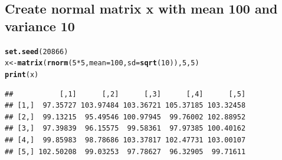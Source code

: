 \documentclass{article}\usepackage[]{graphicx}\usepackage[]{color}
\makeatletter
\newcommand{\hlnum}[1]{\textcolor[rgb]{0.686,0.059,0.569}{#1}}%
\newcommand{\hlopt}[1]{\textcolor[rgb]{0,0,0}{#1}}%
\newcommand{\hlstd}[1]{\textcolor[rgb]{0.345,0.345,0.345}{#1}}%
\newcommand{\hlkwb}[1]{\textcolor[rgb]{0.69,0.353,0.396}{#1}}%
\newcommand{\hlkwc}[1]{\textcolor[rgb]{0.333,0.667,0.333}{#1}}%
\newcommand{\hlkwd}[1]{\textcolor[rgb]{0.737,0.353,0.396}{\textbf{#1}}}%
\newenvironment{kframe}{%
 \def\at@end@of@kframe{}%
 \ifinner\ifhmode%
  \def\at@end@of@kframe{\end{minipage}}%
  \begin{minipage}{\columnwidth}%
 \fi\fi%
 \def\FrameCommand##1{\hskip\@totalleftmargin \hskip-\fboxsep
 \colorbox{shadecolor}{##1}\hskip-\fboxsep
     \hskip-\linewidth \hskip-\@totalleftmargin \hskip\columnwidth}%
 \MakeFramed {\advance\hsize-\width
   \@totalleftmargin\z@ \linewidth\hsize
   \@setminipage}}%
 {\par\unskip\endMakeFramed%
 \at@end@of@kframe}
\newenvironment{knitrout}{}{} %
\makeatother
\begin{document}
\subsection{Create normal matrix x with mean 100 and variance 10}
\begin{knitrout}
\color{fgcolor}\begin{kframe}
\begin{alltt}
\hlkwd{set.seed}\hlstd{(}\hlnum{20866}\hlstd{)}
\hlstd{x} \hlkwb{<-} \hlkwd{matrix}\hlstd{(}\hlkwd{rnorm}\hlstd{(}\hlnum{5}\hlopt{*}\hlnum{5}\hlstd{,} \hlkwc{mean} \hlstd{=} \hlnum{100}\hlstd{,} \hlkwc{sd} \hlstd{=} \hlkwd{sqrt}\hlstd{(}\hlnum{10}\hlstd{)),} \hlnum{5}\hlstd{,} \hlnum{5}\hlstd{)}
\hlkwd{print}\hlstd{(x)}
\end{alltt}
\begin{verbatim}
##           [,1]      [,2]      [,3]      [,4]      [,5]
## [1,]  97.35727 103.97484 103.36721 105.37185 103.32458
## [2,]  99.13215  95.49546 100.97945  99.76002 102.88952
## [3,]  97.39839  96.15575  99.58361  97.97385 100.40162
## [4,]  99.85983  98.78686 103.37817 102.47731 103.00107
## [5,] 102.50208  99.03253  97.78627  96.32905  99.71611
\end{verbatim}
\end{kframe}
\end{knitrout}
\end{document}
